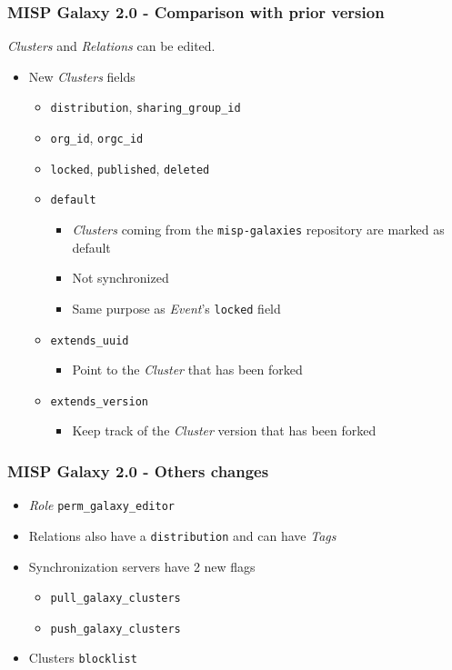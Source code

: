 \begin{frame}
    \frametitle{MISP Galaxy 2.0 - Comparison with prior version}
    \textit{Clusters} and \textit{Relations} can be edited.
    \begin{itemize}
        \item New \textit{Clusters} fields
        \begin{itemize}
            \item \texttt{distribution}, \texttt{sharing\_group\_id}
            \item \texttt{org\_id}, \texttt{orgc\_id}
            \item \texttt{locked}, \texttt{published}, \texttt{deleted}
            \item \texttt{default}
            \begin{itemize}
                \item \textit{Clusters} coming from the \texttt{misp-galaxies} repository are marked as default
                \item Not synchronized
            \end{itemize}
            \begin{itemize}
                \item Same purpose as \textit{Event}'s \texttt{locked} field
            \end{itemize}
            \item \texttt{extends\_uuid}
            \begin{itemize}
                \item Point to the \textit{Cluster} that has been forked
            \end{itemize}
            \item \texttt{extends\_version}
            \begin{itemize}
                \item Keep track of the \textit{Cluster} version that has been forked
            \end{itemize}
        \end{itemize}
    \end{itemize}
\end{frame}

\begin{frame}
    \frametitle{MISP Galaxy 2.0 - Others changes}
    \begin{itemize}
        \item \textit{Role} \texttt{perm\_galaxy\_editor}
        \item Relations also have a \texttt{distribution} and can have \textit{Tags}
        \item Synchronization servers have 2 new flags
        \begin{itemize}
            \item \texttt{pull\_galaxy\_clusters}
            \item \texttt{push\_galaxy\_clusters}
        \end{itemize}
        \item Clusters \texttt{blocklist}
    \end{itemize}
\end{frame}

